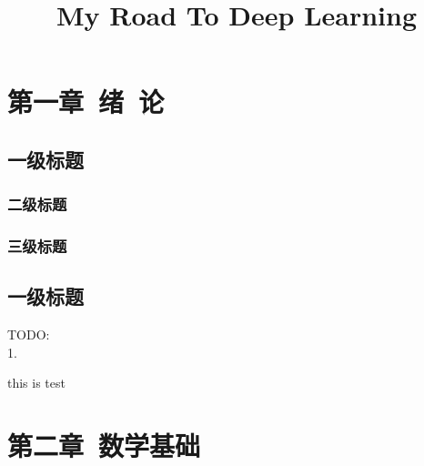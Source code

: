 \documentclass[12pt]{book}
\title{My Road To Deep Learning}
\date{}
\newcommand{\icenter}[1]{\begin{center}{#1}\end{center}}
\newcommand{\isection}[1]{\begin{center}\section*{#1}\end{center}}
\begin{document}
	
\maketitle
\thispagestyle{empty}

\newpage
\setcounter{page}{1}


\icenter{\tableofcontents}


\newpage

\fancyhead{}

\chapter{第一章\ 绪\ 论}
\section{一级标题}
\subsection{二级标题}
\subsection{三级标题}

\section{一级标题}

\noindent TODO:\\1. 

\newpage
this is test
 
 \newpage
 
 \fancyhead{}
 
 \chapter{第二章\ 数学基础}
 
\end{document}
